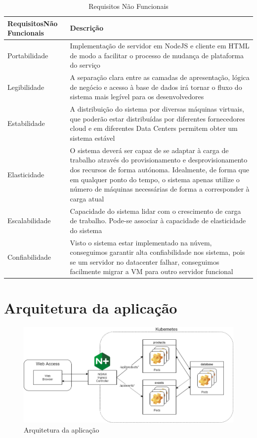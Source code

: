 \documentclass[11pt,a4paper]{article}
\begin{document}
\begin{table}[H]
	\begin{center}
		\begin{tabular}{|p{3.5cm}|p{9.5cm}|}
		\hline
			\textbf{Requisitos\newline Não Funcionais} & \textbf{Descrição}\\ \hline
			Portabilidade & Implementação de servidor em NodeJS e cliente em HTML de modo a facilitar o processo de mudança de plataforma do serviço \\ \hline
			Legibilidade & A separação clara entre as camadas de apresentação, lógica de negócio e acesso à base de dados irá tornar o fluxo do sistema mais legível para os desenvolvedores \\ \hline
			Estabilidade & A distribuição do sistema por diversas máquinas virtuais, que poderão estar distribuídas por diferentes fornecedores cloud e em diferentes Data Centers permitem obter um sistema estável \\ \hline
			Elasticidade & O sistema deverá ser capaz de se adaptar à carga de trabalho através do provisionamento e desprovisionamento dos recursos de forma autónoma. Idealmente, de forma que em qualquer ponto do tempo, o sistema apenas utilize o número de máquinas necessárias de forma a corresponder à carga atual \\ \hline
			Escalabilidade & Capacidade do sistema lidar com o crescimento de carga de trabalho. Pode-se associar à capacidade de elasticidade do sistema \\ \hline
			Confiabilidade & Visto o sistema estar implementado na núvem, conseguimos garantir alta confiabilidade nos sistema, pois se um servidor no datacenter falhar, conseguimos facilmente migrar a VM para outro servidor funcional \\ \hline
	\end{tabular}
	\label{tab1}
	\end{center}
	\caption{Requisitos Não Funcionais}
\end{table}



\section{Arquitetura da aplicação}
\begin{figure}[H]
  \centering
  \includegraphics[scale=0.4]{App_arc.png}
  \caption{Arquitetura da aplicação}
\end{figure}
\end{document}
